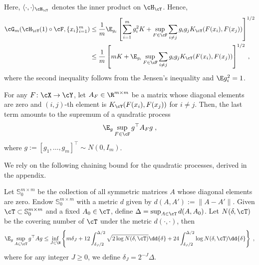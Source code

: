 \documentclass[11pt]{article}
\begin{document}
Here, $\langle \cdot, \cdot \rangle_{\cH_{\cY}}$ denotes the inner product on $\cH_{\cY}$. Hence, 
\begin{align*}
	\cG_m(\cH_{\cY}(1)\circ \cF, \{x_i\}_{i=1}^m)
	& \le \frac{1}{m} \E_{g_i} \left[\sum_{i = 1}^{m} g_i^2 K + \sup_{F \in \cF} \sum_{i\neq j} g_i g_j K_{\cY}(F(x_i), F(x_j)) \right]^{1/2} \\
	& \le \frac{1}{m} \left[ m K + \E_{g_i} \sup_{F \in \cF} \sum_{i\neq j} g_i g_j K_{\cY}(F(x_i), F(x_j)) \right]^{1/2} \;,
\end{align*}
where the second inequality follows from the Jensen's inequality and $\E g_i^2 = 1$.

For any $F \colon \cX \to \cY$, let $A_F \in \R^{m \times m}$ be a matrix whose diagonal elements are zero and $(i, j)$-th element is $K_{\cY}(F(x_i), F(x_j))$ for $i \neq j$. Then, the last term amounts to the supremum of a quadratic process
\begin{align*}
	\E_{g} \sup_{F \in \cF} g^\top A_F g \;,
\end{align*}
where $g := [g_1, \ldots, g_m]^\top \sim N(0, I_m)$.

We rely on the following chaining bound for the quadratic processes, derived in the appendix.
\begin{lemma}
	\label{lem:chaining}
	Let $\mathbb{S}_0^{m \times m}$ be the collection of all symmetric matrices $A$ whose diagonal elements are zero. Endow $\mathbb{S}_0^{m\times m}$ with a metric $d$ given by $d(A, A') := \| A - A'\|$. Given $\cT \subset \mathbb{S}_0^{m \times m}$ and a fixed $A_0 \in \cT$, define $\Delta = \sup_{A \in \cT} d(A, A_0)$. Let $N(\delta, \cT)$ be the covering number of $\cT$ under the metric $d(\cdot, \cdot)$, then
	\begin{equation}
		\label{eqn:chain}
		\E_{g} \sup_{A \in \cT} g^\top A g 
		\leq \inf_{J \in \N} \left\{m \delta_J +  12 \int_{\delta_J / 2}^{\Delta/2} \sqrt{2 \log N(\delta, \cT)} \dd{\delta} + 24 \int_{\delta_J / 2}^{\Delta/2} \log N(\delta, \cT) \dd{\delta} \right\} \;,
	\end{equation}
	where for any integer $J \geq 0$, we define $\delta_J = 2^{-J} \Delta$.	
\end{lemma}
\end{document}
